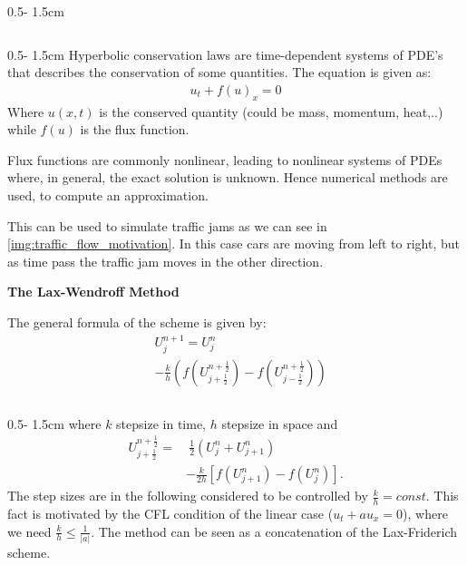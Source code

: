 \documentclass{uibposter}
\begin{document}
\begin{frame}[fragile]
\begin{columns}
\begin{column}{0.5\textwidth - 1.5cm}
\begin{column}{0.5\textwidth - 1.5cm}
Hyperbolic conservation laws are time-dependent systems of PDE's that describes the conservation of some quantities. The equation is given as:
\begin{align*}
    u_t + f(u)_x = 0
\end{align*}
Where $u(x,t)$ is the conserved quantity (could be mass, momentum, heat,..) while $f(u)$ is the flux function.

Flux functions are commonly nonlinear, leading to nonlinear systems of PDEs where, in general, the exact solution is unknown. Hence numerical methods are used, to compute an approximation. 

\vspace{0.5cm}
This can be used to simulate traffic jams as we can see in \cref{img:traffic_flow_motivation}. In this case cars are moving from left to right, but as time pass the traffic jam moves in the other direction. 

\vspace{0.5cm}
\textbf{The Lax-Wendroff Method}

\vspace{0.5cm}
The general formula of the scheme is given by:
\begin{align*}
&U_j^{n+1} = U_j^n\\
&- \frac{k}{h}\left(f\left(U_{j+\frac{1}{2}}^{n+\frac{1}{2}}\right) - f\left(U_{j-\frac{1}{2}}^{n+\frac{1}{2}}\right)\right)
\end{align*}

\end{column}
\begin{column}{0.5\textwidth - 1.5cm}
where $k$ stepsize in time, $h$ stepsize in space and
\begin{align*}
U_{j+\frac{1}{2}}^{n+\frac{1}{2}} =&~ \frac{1}{2} (U_j^n + U_{j+1}^n)\\
&- \frac{k}{2h}[f(U_{j+1}^n) - f(U_j^n)].
\end{align*}
The step sizes are in the following considered to be controlled by $\frac{k}{h} = const$. This fact is motivated by the CFL condition of the linear case ($u_t + au_x = 0$), where we need $\frac{k}{h} \leq \frac{1}{|a|}$. 
The method can be seen as a concatenation of the Lax-Friderich scheme.


\end{column}
\end{column}
\end{columns}
\end{frame}
\end{document}
